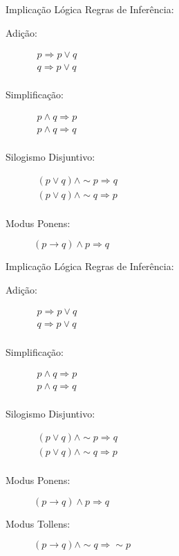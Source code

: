 \begin{frame}[t]{Implicação Lógica} %
	Regras de Inferência:
	\begin{description}
	\item[Adição:] 
		$\begin{array}{l}
		   p \Rightarrow p \vee q \\ 
		   q \Rightarrow p \vee q \\
		\end{array}$

	\item[Simplificação:] 
		$\begin{array}{l}
		  p \wedge q \Rightarrow p \\
		  p \wedge q \Rightarrow q \\
		\end{array}$

	\item[Silogismo Disjuntivo:] 
		$\begin{array}{l}
		  (p \vee q) \wedge \sim p \Rightarrow q \\
		  (p \vee q) \wedge \sim q \Rightarrow p \\
		\end{array}$

	\item[Modus Ponens:] $ (p \rightarrow q) \wedge p \Rightarrow q$

	\end{description}
\end{frame}

\begin{frame}[t]{Implicação Lógica} %
	Regras de Inferência:
	\begin{description}
	\item[Adição:] 
		$\begin{array}{l}
		   p \Rightarrow p \vee q \\ 
		   q \Rightarrow p \vee q \\
		\end{array}$

	\item[Simplificação:] 
		$\begin{array}{l}
		  p \wedge q \Rightarrow p \\
		  p \wedge q \Rightarrow q \\
		\end{array}$

	\item[Silogismo Disjuntivo:] 
		$\begin{array}{l}
		  (p \vee q) \wedge \sim p \Rightarrow q \\
		  (p \vee q) \wedge \sim q \Rightarrow p \\
		\end{array}$

	\item[Modus Ponens:] $ (p \rightarrow q) \wedge p \Rightarrow q$

	\item[Modus Tollens:] $ (p \rightarrow q) \wedge \sim q \Rightarrow \sim p$

	\end{description}
\end{frame}

